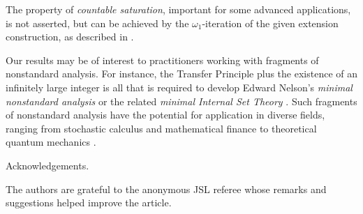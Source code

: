 \documentclass[11pt,
]{article}
\begin{document}
The property of \emph{countable saturation},
important for some advanced applications, 
is not asserted, but can be achieved by the 
$\omega_1$-iteration of the given
extension construction, as described in \cite[Section 4]{KS}.


Our results may be of interest to practitioners working with fragments
of nonstandard analysis.  For instance, the Transfer Principle plus
the existence of an infinitely large integer is all that is required
to develop Edward Nelson's \cite[p.~30]{N07} \emph{minimal nonstandard
analysis} or the related \emph{minimal Internal Set Theory}
\cite[pp., 4, 104]{herz+}.  Such fragments of nonstandard analysis
have the potential for application in diverse fields, ranging from
stochastic calculus and mathematical finance to theoretical quantum
mechanics \cite{herz+}.

{\ubf Acknowledgements.}  

The authors are grateful to the anonymous JSL referee whose remarks
and suggestions helped improve the article.
\end{document}
